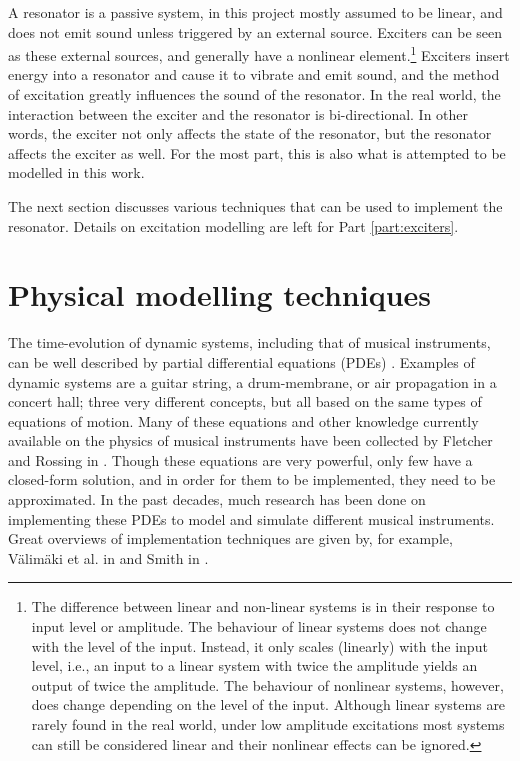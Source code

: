 A resonator is a passive system, in this project  mostly assumed to be linear, and does not emit sound unless triggered by an external source. Exciters can be seen as these external sources, and generally have a nonlinear element.\footnote{The difference between linear and non-linear systems is in their response to input level or amplitude. The behaviour of linear systems does not change with the level of the input. Instead, it only scales (linearly) with the input level, i.e., an input to a linear system with twice the amplitude yields an output of twice the amplitude. The behaviour of nonlinear systems, however, does change depending on the level of the input. Although linear systems are rarely found in the real world, under low amplitude excitations most systems can still be considered linear and their nonlinear effects can be ignored.} Exciters insert energy into a resonator and cause it to vibrate and emit sound, and the method of excitation greatly influences the sound of the resonator. In the real world, the interaction between the exciter and the resonator is bi-directional. In other words, the exciter not only affects the state of the resonator, but the resonator affects the exciter as well. For the most part, this is also what is attempted to be modelled in this work.

The next section discusses various techniques that can be used to implement the resonator. Details on excitation modelling are left for Part \ref{part:exciters}.

\section{Physical modelling techniques}\label{sec:physModTech}
The time-evolution of dynamic systems, including that of musical instruments, can be well described by partial differential equations (PDEs) \cite{Fletcher1998, theBible}. Examples of dynamic systems are a guitar string, a drum-membrane, or air propagation in a concert hall; three very different concepts, but all based on the same types of equations of motion. Many of these equations and other knowledge currently available on the physics of musical instruments have been collected by Fletcher and Rossing in \cite{Fletcher1998}. Though these equations are very powerful, only few have a closed-form solution, and in order for them to be implemented, they need to be approximated. In the past decades, much research has been done on implementing these PDEs to model and simulate different musical instruments. Great overviews of implementation techniques are given by, for example, V{\"a}lim{\"a}ki et al. in \cite{Valimaki2006} and Smith in \cite{Smith2010a, Smith2010b}. 
\\


